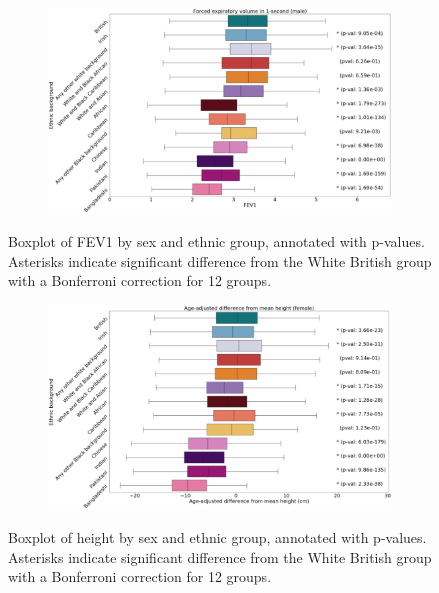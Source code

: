 \documentclass[12pt]{pnas-new}
\begin{document}
\begin{figure}
    \centering
    \begin{subfigure}{\textwidth}
    \includegraphics[width=\textwidth]{images/male_fev_boxplot_annotated.pdf}
    \end{subfigure}
    \caption{Boxplot of FEV1 by sex and ethnic group, annotated with p-values. Asterisks indicate significant difference from the White British group with a Bonferroni correction for 12 groups.}
    \label{fig:supp_box_fev_m}
\end{figure}

\begin{figure}
    \centering
    \begin{subfigure}{\textwidth}
    \includegraphics[width=\textwidth]{images/female_height_boxplot_annotated.pdf}
    \end{subfigure}
    \caption{Boxplot of height by sex and ethnic group, annotated with p-values. Asterisks indicate significant difference from the White British group with a Bonferroni correction for 12 groups.}
    \label{fig:supp_box_height_f}
\end{figure}
\end{document}
